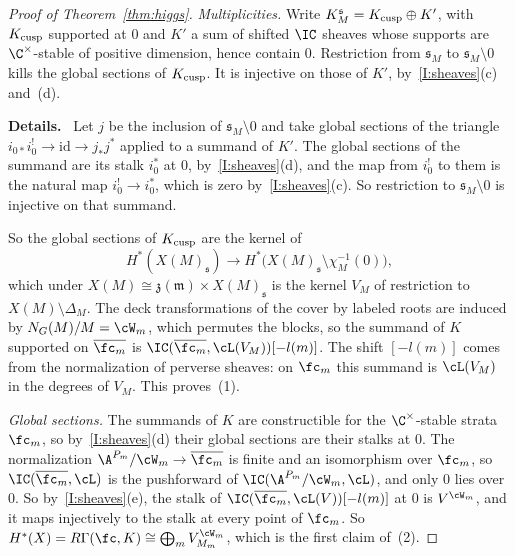 \documentclass[11pt]{amsart}
\newenvironment{details}{\par\color{black!60!green}\noindent\textbf{Details.}\ }{\par}
\begin{document}
\begin{proof}[Proof of Theorem~\ref{thm:higgs}]
\emph{Multiplicities.}  Write $K^{\mathfrak s}_M=K_{\rm cusp}\oplus K'$, with $K_{\rm cusp}$ supported at $0$
and $K'$ a sum of shifted $\IC$ sheaves whose supports are
$\C^\times$-stable of positive dimension, hence contain $0$.  Restriction
from $\mathfrak s_M$ to $\mathfrak s_M\setminus0$ kills the global sections of $K_{\rm cusp}$.  It is
injective on those of $K'$, by~\ref{I:sheaves}(c) and~(d).
\begin{details}
Let $j$ be the inclusion of
$\mathfrak s_M\setminus0$ and take global sections of the triangle
$i_{0*}i_0^!\to\mathrm{id}\to j_*j^*$ applied to a summand of $K'$.  The
global sections of the summand are its stalk $i_0^*$ at $0$,
by~\ref{I:sheaves}(d), and the map from $i_0^!$ to them is the natural map
$i_0^!\to i_0^*$, which is zero by~\ref{I:sheaves}(c).  So restriction to
$\mathfrak s_M\setminus0$ is injective on that summand.
\end{details}
So the global sections of $K_{\rm cusp}$ are
the kernel of
\[
 H^*(X(M)_{\mathfrak s})\to H^*\big(X(M)_{\mathfrak s}\setminus\chi_M^{-1}(0)\big),
\]
which under $X(M)\cong\mathfrak z(\mathfrak m)\times X(M)_{\mathfrak s}$ is the kernel
$V_M$ of restriction to $X(M)\setminus\Delta_M$.  The deck transformations of
the cover by labeled roots are induced by $N_G(M)/M=\cW_m$, which permutes the
blocks, so the summand of $K$ supported on $\overline{\fc_m}$ is
$\IC(\overline{\fc_m},\cL(V_M))[-l(m)]$.  The shift $[-l(m)]$ comes from the
normalization of perverse sheaves: on $\fc_m$ this summand is $\cL(V_M)$ in the
degrees of $V_M$.  This proves~(1).

\emph{Global sections.}  The summands of $K$ are constructible for the
$\C^\times$-stable strata $\fc_m$, so by~\ref{I:sheaves}(d) their global
sections are their stalks at $0$.  The normalization
$\A^{P_m}/\cW_m\to\overline{\fc_m}$ is finite and an isomorphism over $\fc_m$, so
$\IC(\overline{\fc_m},\cL)$ is the pushforward of $\IC(\A^{P_m}/\cW_m,\cL)$, and only
$0$ lies over $0$.  So by~\ref{I:sheaves}(e), the stalk of $\IC(\overline{\fc_m},\cL(V))[-l(m)]$ at
$0$ is $V^{\cW_m}$, and it maps injectively to the stalk at every point of
$\fc_m$.  So $H^*(X)=R\Gamma(\fc,K)\cong\bigoplus_mV_{M_m}^{\cW_m}$, which is the
first claim of~(2).


\end{proof}
\end{document}
